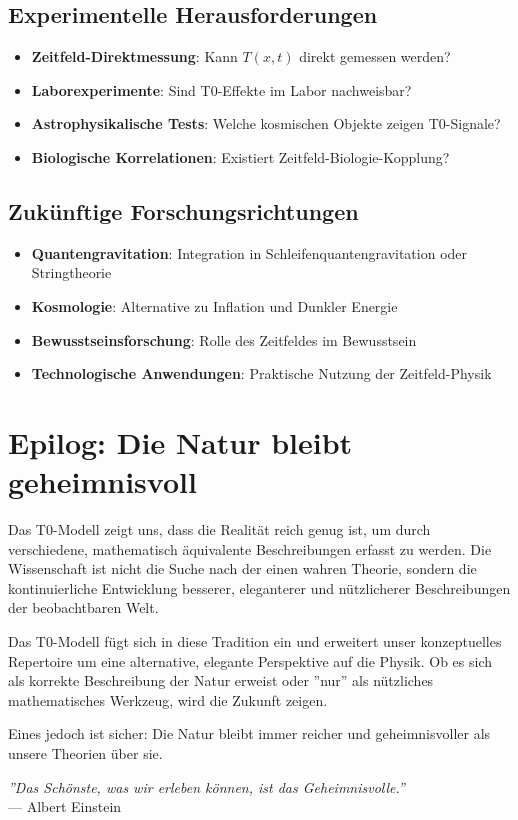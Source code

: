 \documentclass[12pt,a4paper]{report}
\begin{document}
	\subsection{Experimentelle Herausforderungen}
	
	\begin{itemize}
		\item \textbf{Zeitfeld-Direktmessung}: Kann $T(x,t)$ direkt gemessen werden?
		\item \textbf{Laborexperimente}: Sind T0-Effekte im Labor nachweisbar?
		\item \textbf{Astrophysikalische Tests}: Welche kosmischen Objekte zeigen T0-Signale?
		\item \textbf{Biologische Korrelationen}: Existiert Zeitfeld-Biologie-Kopplung?
	\end{itemize}
	
	\subsection{Zukünftige Forschungsrichtungen}
	
	\begin{itemize}
		\item \textbf{Quantengravitation}: Integration in Schleifenquantengravitation oder Stringtheorie
		\item \textbf{Kosmologie}: Alternative zu Inflation und Dunkler Energie
		\item \textbf{Bewusstseinsforschung}: Rolle des Zeitfeldes im Bewusstsein
		\item \textbf{Technologische Anwendungen}: Praktische Nutzung der Zeitfeld-Physik
	\end{itemize}
	
	\section{Epilog: Die Natur bleibt geheimnisvoll}
	
	Das T0-Modell zeigt uns, dass die Realität reich genug ist, um durch verschiedene, mathematisch äquivalente Beschreibungen erfasst zu werden. Die Wissenschaft ist nicht die Suche nach der einen wahren Theorie, sondern die kontinuierliche Entwicklung besserer, eleganterer und nützlicherer Beschreibungen der beobachtbaren Welt.
	
	Das T0-Modell fügt sich in diese Tradition ein und erweitert unser konzeptuelles Repertoire um eine alternative, elegante Perspektive auf die Physik. Ob es sich als korrekte Beschreibung der Natur erweist oder ''nur'' als nützliches mathematisches Werkzeug, wird die Zukunft zeigen.
	
	Eines jedoch ist sicher: Die Natur bleibt immer reicher und geheimnisvoller als unsere Theorien über sie.
	
	\begin{center}
		\textit{''Das Schönste, was wir erleben können, ist das Geheimnisvolle.''} \\
		— Albert Einstein
	\end{center}
	
\end{document}
